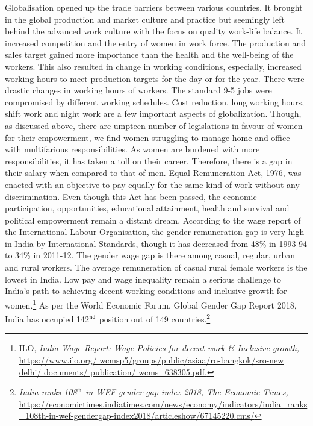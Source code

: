 \begin{multicols}{2}
\noi
Globalisation opened up the trade barriers between various countries. It brought in the global
production and market culture and practice but seemingly left behind the advanced work
culture with the focus on quality work-life balance. It increased competition and the entry of
women in work force. The production and sales target gained more importance than the
health and the well-being of the workers. This also resulted in change in working conditions,
especially, increased working hours to meet production targets for the day or for the year.
There were drastic changes in working hours of workers. The standard 9-5 jobs were
compromised by different working schedules. Cost reduction, long working hours, shift work
and night work are a few important aspects of globalization. Though, as discussed above,
there are umpteen number of legislations in favour of women for their empowerment, we find
women struggling to manage home and office with multifarious responsibilities. As women
are burdened with more responsibilities, it has taken a toll on their career. Therefore, there is
a gap in their salary when compared to that of men. Equal Remuneration Act, 1976, was
enacted with an objective to pay equally for the same kind of work without any
discrimination. Even though this Act has been passed, the economic participation,
opportunities, educational attainment, health and survival and political empowerment remain
a distant dream. According to the wage report of the International Labour Organisation, the
gender remuneration gap is very high in India by International Standards, though it has
decreased from 48\% in 1993-94 to 34\% in 2011-12. The gender wage gap is there among
casual, regular, urban and rural workers. The average remuneration of casual rural female
workers is the lowest in India. Low pay and wage inequality remain a serious challenge to
India’s path to achieving decent working conditions and inclusive growth for women.\footnote{ILO, \textit{India Wage Report: Wage Policies for decent work \& Inclusive growth,} \url{https://www.ilo.org/
wcmsp5/groups/public/asiaa/ro-bangkok/sro-new delhi/ documents/ publication/ wcms_638305.pdf.}} As
per the World Economic Forum, Global Gender Gap Report 2018, India has occupied 142$^{\rm nd}$
position out of 149 countries.\footnote{\textit{India ranks 108$^{\rm th}$ in WEF gender gap index 2018, The Economic Times,}  \url{https://economictimes.indiatimes.com/news/economy/indicators/india_ranks_108th-in-wef-gendergap-index2018/articleshow/67145220.cms/}}



\end{multicols}

